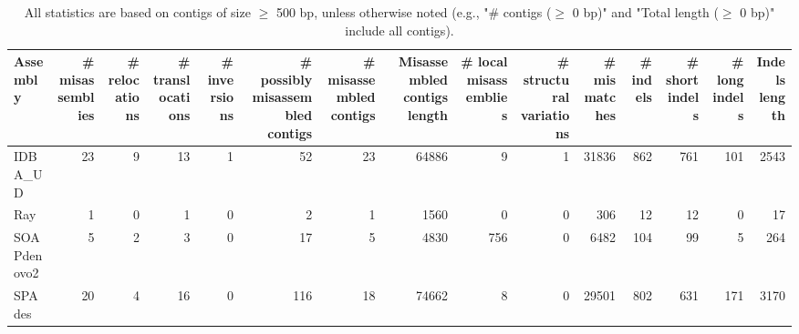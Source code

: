 \documentclass[12pt,a4paper]{article}
\begin{document}
\begin{table}[ht]
\begin{center}
\caption{All statistics are based on contigs of size $\geq$ 500 bp, unless otherwise noted (e.g., "\# contigs ($\geq$ 0 bp)" and "Total length ($\geq$ 0 bp)" include all contigs).}
\begin{tabular}{|l*{14}{|r}|}
\hline
Assembly & \# misassemblies &     \# relocations &     \# translocations &     \# inversions & \# possibly misassembled contigs & \# misassembled contigs & Misassembled contigs length & \# local misassemblies & \# structural variations & \# mismatches & \# indels &     \# short indels &     \# long indels & Indels length \\ \hline
IDBA\_UD & 23 & 9 & 13 & 1 & 52 & 23 & 64886 & 9 & 1 & 31836 & 862 & 761 & 101 & 2543 \\ \hline
Ray & 1 & 0 & 1 & 0 & 2 & 1 & 1560 & 0 & 0 & 306 & 12 & 12 & 0 & 17 \\ \hline
SOAPdenovo2 & 5 & 2 & 3 & 0 & 17 & 5 & 4830 & 756 & 0 & 6482 & 104 & 99 & 5 & 264 \\ \hline
SPAdes & 20 & 4 & 16 & 0 & 116 & 18 & 74662 & 8 & 0 & 29501 & 802 & 631 & 171 & 3170 \\ \hline
\end{tabular}
\end{center}
\end{table}
\end{document}
